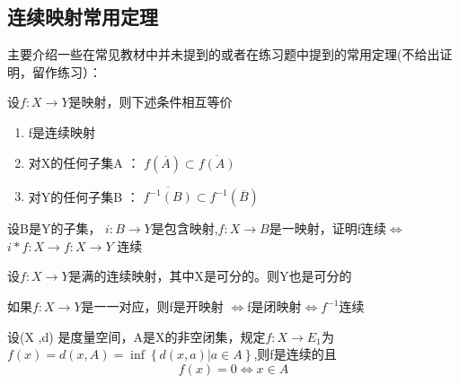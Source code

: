 \subsection*{连续映射常用定理}
主要介绍一些在常见教材中并未提到的或者在练习题中提到的常用定理(不给出证明，留作练习）：
\begin{theorem}
  设\(f: X \rightarrow Y \)是映射，则下述条件相互等价
    \begin{enumerate}
    \item f是连续映射 \\
    \item 对X的任何子集A ： \(f(\overline{A}) \subset \overline{f(A)}\) \\
    \item 对Y的任何子集B ： \(\overline{f^{-1}(B)} \subset f^{-1}(\overline{B})\)
    \end{enumerate}
\end{theorem}
\begin{theorem}
    设B是Y的子集， \(i : B \rightarrow Y \)是包含映射,\(f: X \rightarrow B \)是一映射，证明f连续\(\Leftrightarrow\) \(i * f : X \rightarrow f : X \rightarrow Y \) 连续
\end{theorem}
\begin{theorem}
    设\(f: X \rightarrow Y \)是满的连续映射，其中X是可分的。则Y也是可分的
\end{theorem}
\begin{theorem}
    如果\(f: X \rightarrow Y \)是一一对应，则f是开映射 \(\Leftrightarrow\)f是闭映射\(\Leftrightarrow f^{-1}\)连续
\end{theorem}
\begin{theorem}
   设(X ,d) 是度量空间，A是X的非空闭集，规定\(f: X \rightarrow E_1\)为\(f(x)= d (x,A) = \inf\left\{d(x,a)| a \in A \right\}\),则f是连续的且\
 \[f(x) = 0 \Leftrightarrow x \in  A \]
\end{theorem}
